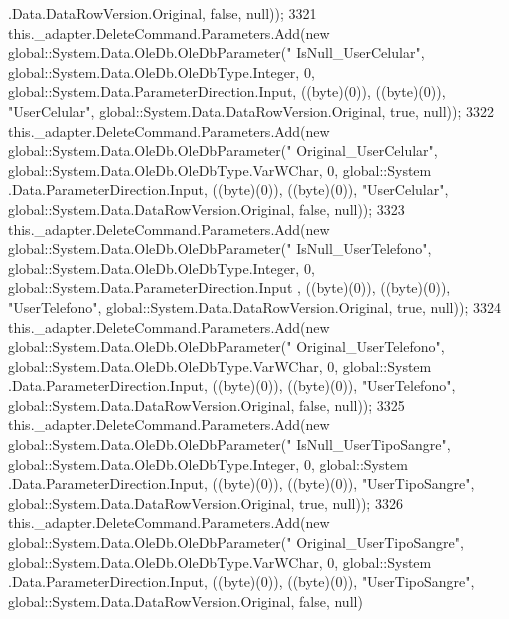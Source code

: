 \begin{DoxyCode}
      .Data.DataRowVersion.Original, \textcolor{keyword}{false}, null));
3321             this.\_adapter.DeleteCommand.Parameters.Add(\textcolor{keyword}{new} global::System.Data.OleDb.OleDbParameter(\textcolor{stringliteral}{"
      IsNull\_UserCelular"}, global::System.Data.OleDb.OleDbType.Integer, 0, global::System.Data.ParameterDirection.Input,
       ((byte)(0)), ((byte)(0)), \textcolor{stringliteral}{"UserCelular"}, global::System.Data.DataRowVersion.Original, \textcolor{keyword}{true}, null));
3322             this.\_adapter.DeleteCommand.Parameters.Add(\textcolor{keyword}{new} global::System.Data.OleDb.OleDbParameter(\textcolor{stringliteral}{"
      Original\_UserCelular"}, global::System.Data.OleDb.OleDbType.VarWChar, 0, global::System
      .Data.ParameterDirection.Input, ((byte)(0)), ((byte)(0)), \textcolor{stringliteral}{"UserCelular"}, global::System.Data.DataRowVersion.Original, \textcolor{keyword}{false}, null));
3323             this.\_adapter.DeleteCommand.Parameters.Add(\textcolor{keyword}{new} global::System.Data.OleDb.OleDbParameter(\textcolor{stringliteral}{"
      IsNull\_UserTelefono"}, global::System.Data.OleDb.OleDbType.Integer, 0, global::System.Data.ParameterDirection.Input
      , ((byte)(0)), ((byte)(0)), \textcolor{stringliteral}{"UserTelefono"}, global::System.Data.DataRowVersion.Original, \textcolor{keyword}{true}, null));
3324             this.\_adapter.DeleteCommand.Parameters.Add(\textcolor{keyword}{new} global::System.Data.OleDb.OleDbParameter(\textcolor{stringliteral}{"
      Original\_UserTelefono"}, global::System.Data.OleDb.OleDbType.VarWChar, 0, global::System
      .Data.ParameterDirection.Input, ((byte)(0)), ((byte)(0)), \textcolor{stringliteral}{"UserTelefono"}, global::System.Data.DataRowVersion.Original, \textcolor{keyword}{false}, null));
3325             this.\_adapter.DeleteCommand.Parameters.Add(\textcolor{keyword}{new} global::System.Data.OleDb.OleDbParameter(\textcolor{stringliteral}{"
      IsNull\_UserTipoSangre"}, global::System.Data.OleDb.OleDbType.Integer, 0, global::System
      .Data.ParameterDirection.Input, ((byte)(0)), ((byte)(0)), \textcolor{stringliteral}{"UserTipoSangre"}, global::System.Data.DataRowVersion.Original, \textcolor{keyword}{true}, null));
3326             this.\_adapter.DeleteCommand.Parameters.Add(\textcolor{keyword}{new} global::System.Data.OleDb.OleDbParameter(\textcolor{stringliteral}{"
      Original\_UserTipoSangre"}, global::System.Data.OleDb.OleDbType.VarWChar, 0, global::System
      .Data.ParameterDirection.Input, ((byte)(0)), ((byte)(0)), \textcolor{stringliteral}{"UserTipoSangre"}, global::System.Data.DataRowVersion.Original, \textcolor{keyword}{false}, null)

\end{DoxyCode}

